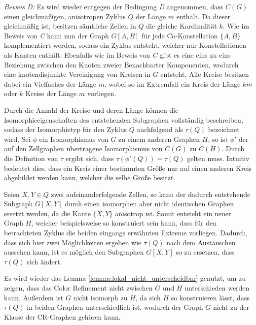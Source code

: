\emph{Beweis D:} Es wird wieder entgegen der Bedingung \emph{D} angenommen, dass $C(G)$ einen gleichmäßigen, anisotropen Zyklus $Q$ der Länge $m$ enthält.
Da dieser gleichmäßig ist, besitzen sämtliche Zellen in $Q$ die gleiche Kardinalität $k$.
Wie im Beweis von \emph{C} kann nun der Graph $G[A,B]$ für jede Co-Konstellation $\{A,B\}$ komplementiert werden, sodass ein Zyklus entsteht, welcher nur Konstellationen als Kanten enthält.
Ebenfalls wie im Beweis von \emph{C} gibt es eine eins zu eins Beziehung zwischen den Knoten zweier Benachbarter Komponenten, wodurch eine knotendisjunkte Vereinigung von Kreisen in $G$ entsteht.
Alle Kreise besitzen dabei ein Vielfaches der Länge $m$, wobei so im Extremfall ein Kreis der Länge $km$ oder $k$ Kreise der Länge $m$ vorliegen.

Durch die Anzahl der Kreise und deren Länge können die Isomorphieeigenschaften des entstehenden Subgraphen vollständig beschreiben, sodass der Isomorphietyp für den Zyklus $Q$ nachfolgend als $\tau (Q)$ bezeichnet wird.
Sei $\phi $ ein Isomorphismus von $G$ zu einem anderen Graphen $H$, so ist $\phi '$ der auf den Zellgraphen übertragene Isomorphismus von $C(G)$ zu $C(H)$.
Durch die Definition von $\tau $ ergibt sich, dass $\tau (\phi '(Q))=\tau (Q)$ gelten muss.
Intuitiv bedeutet dies, dass ein Kreis einer bestimmten Größe nur auf einen anderen Kreis abgebildet werden kann, welcher die selbe Größe besitzt.

Seien $X,Y\in Q$ zwei aufeinanderfolgende Zellen, so kann der dadurch entstehende Subgraph $G[X,Y]$ durch einen isomorphen aber nicht identischen Graphen ersetzt werden, da die Kante $\{X,Y\}$ anisotrop ist.
Somit entsteht ein neuer Graph $H$, welcher beispielsweise so konstruiert sein kann, dass für den betrachteten Zyklus die beiden eingangs erwähnten Extreme vorliegen.
Dadurch, dass sich hier zwei Möglichkeiten ergeben wie $\tau (Q)$ nach dem Austauschen aussehen kann, ist es möglich den Subgraphen $G[X,Y]$ so zu ersetzen, dass $\tau (Q)$ sich ändert.

Es wird wieder das Lemma \ref{lemma:lokal_nicht_unterscheidbar} genutzt, um zu zeigen, dass das Color Refinement nicht zwischen $G$ und $H$ unterschieden werden kann.
Außerdem ist $G$ nicht isomorph zu $H$, da sich $H$ so konstruieren lässt, dass $\tau (Q)$ in beiden Graphen unterschiedlich ist, wodurch der Graph $G$ nicht zu der Klasse der CR-Graphen gehören kann.\\

